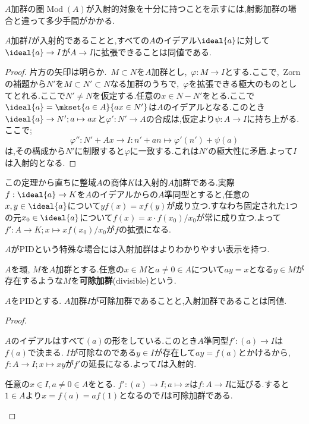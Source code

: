 $A$加群の圏$\operatorname{Mod}(A)$が入射的対象を十分に持つことを示すには,射影加群の場合と違って多少手間がかかる.

\begin{thm}
	$A$加群$I$が入射的であることと,すべての$A$のイデアル$\ideal{a}$に対して$\ideal{a}\to I$が$A\to I$に拡張できることは同値である.
\end{thm}

\begin{proof}
	片方の矢印は明らか.~$M\subset N$を$A$加群とし,~$\varphi:M\to I$とする.ここで,~Zornの補題から$N'$を$M\subset N'\subset N$なる加群のうちで,~$\varphi$を拡張できる極大のものとしてとれる.ここで$N'\neq N$を仮定する.任意の$x\in N-N'$をとる.ここで$\ideal{a}=\mkset{a\in A}{ax\in N'}$は$A$のイデアルとなる.このとき$\ideal{a}\to N';a\mapsto ax$と$\varphi':N'\to A$の合成は,仮定より$\psi:A\to I$に持ち上がる.ここで;
	\[\varphi'':N'+Ax\to I:n'+an\mapsto \varphi'(n')+\psi(a)\]
	は,その構成から$N'$に制限すると$\varphi$に一致する.これは$N'$の極大性に矛盾.よって$I$は入射的となる. 
\end{proof}

この定理から直ちに整域$A$の商体$K$は入射的$A$加群である.実際$f:\ideal{a}\to K$を$A$のイデアルからの$A$準同型とすると,任意の$x,y\in \ideal{a}$について$yf(x)=xf(y)$が成り立つ.すなわち固定された1つの元$x_0\in \ideal{a}$について$f(x)=x\cdot f(x_0)/x_0$が常に成り立つ.よって$f':A\to K;x\mapsto xf(x_0)/x_0$が$f$の拡張になる.

$A$がPIDという特殊な場合には入射加群はよりわかりやすい表示を持つ.
\begin{defi}[可除加群]
	$A$を環, $M$を$A$加群とする.任意の$x\in M$と$a\neq0\in A$について$ay=x$となる$y\in M$が存在するような$M$を\textbf{可除加群}(divisible)という.
\end{defi}

\begin{prop}
	$A$をPIDとする. $A$加群$I$が可除加群であることと,入射加群であることは同値.
\end{prop}

\begin{proof}
	\begin{eqv}
		\item $A$のイデアルはすべて$(a)$の形をしている.このとき$A$準同型$f':(a)\to I$は$f(a)$で決まる. $I$が可除なのである$y\in I$が存在して$ay=f(a)$とかけるから, $f:A\to I;x\mapsto xy$が$f'$の延長になる.よって$I$は入射的.
		
		\item 任意の$x\in I,a\neq0\in A$をとる. $f':(a)\to I;a\mapsto x$は$f:A\to I$に延びる.すると$1\in A$より$x=f(a)=af(1)$となるので$I$は可除加群である.
	\end{eqv}
\end{proof}

